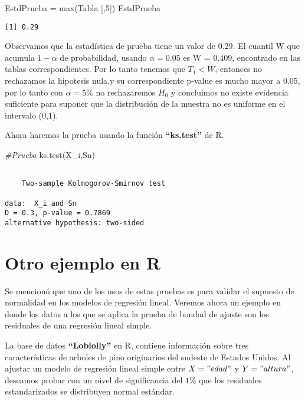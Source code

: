 \documentclass[
  a4paper,
  oneside,
  openany]{book}
\newenvironment{Shaded}{\begin{snugshade}}{\end{snugshade}}
\newcommand{\CommentTok}[1]{\textcolor[rgb]{0.56,0.35,0.01}{\textit{#1}}}
\newcommand{\DecValTok}[1]{\textcolor[rgb]{0.00,0.00,0.81}{#1}}
\newcommand{\FunctionTok}[1]{\textcolor[rgb]{0.00,0.00,0.00}{#1}}
\newcommand{\NormalTok}[1]{#1}
\newcommand{\OtherTok}[1]{\textcolor[rgb]{0.56,0.35,0.01}{#1}}
\begin{document}
\begin{Shaded}
\begin{Highlighting}[]
\NormalTok{EstdPrueba }\OtherTok{=} \FunctionTok{max}\NormalTok{(Tabla [,}\DecValTok{5}\NormalTok{])}
\NormalTok{EstdPrueba}
\end{Highlighting}
\end{Shaded}

\begin{verbatim}
[1] 0.29
\end{verbatim}

Observamos que la estadística de prueba tiene un valor de 0.29. El cuantil W que acumula \(1-\alpha\) de probabilidad, usando \(\alpha=0.05\) es W = 0.409, encontrado en las tablas correspondientes. Por lo tanto tenemos que \(T_1 < W\), entonces no rechazamos la hipotesis nula.y su correspondiente p-value es mucho mayor a 0.05, por lo tanto con \(\alpha=5\%\) no rechazaremos \(H_0\) y concluimos no existe evidencia suficiente para suponer que la distribución de la muestra no es uniforme en el intervalo (0,1).

Ahora haremos la prueba usando la función \textbf{``ks.test''} de R.

\begin{Shaded}
\begin{Highlighting}[]
\CommentTok{\#Prueba}
\FunctionTok{ks.test}\NormalTok{(X\_i,Sn)}
\end{Highlighting}
\end{Shaded}

\begin{verbatim}

    Two-sample Kolmogorov-Smirnov test

data:  X_i and Sn
D = 0.3, p-value = 0.7869
alternative hypothesis: two-sided
\end{verbatim}

\hypertarget{otro-ejemplo-en-r}{%
\section{Otro ejemplo en R}\label{otro-ejemplo-en-r}}

Se mencionó que uno de los usos de estas pruebas es para validar el supuesto de normalidad en los modelos de regresión lineal. Veremos ahora un ejemplo en donde los datos a los que se aplica la prueba de bondad de ajuste son los residuales de una regresión lineal simple.

La base de datos \textbf{``Loblolly''} en R, contiene información sobre tres características de arboles de pino originarios del sudeste de Estados Unidos. Al ajustar un modelo de regresión lineal simple entre \(X="edad"\) y \(Y="altura"\), deseamos probar con un nivel de significancia del \(1\%\) que los residuales estandarizados se distribuyen normal estándar.
\end{document}

